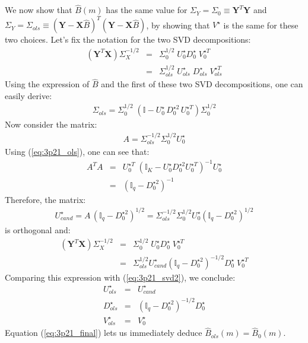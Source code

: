 \begin{itemize}
    We now show that $\hat{B}(m)$ has the same value for $\Sigma_Y = \Sigma_{0} \equiv \mathbf{Y}^T \mathbf{Y}$ and  $\Sigma_Y = \Sigma_{ols} \equiv \left( \mathbf{Y} - \mathbf{X} \hat{B} \right)^T \left( \mathbf{Y} - \mathbf{X} \hat{B} \right)$, by showing that $V ^{\star}$ is the same for these two choices. Let's fix the notation for the two SVD decompositions:
    \begin{eqnarray} \label{eq:3p21_svd1}
    (\mathbf{Y}^T \mathbf{X}) \Sigma_X^{-1/2} & = & \Sigma_{0}^{1/2} \;U_0 ^{\star} D_0 ^{\star}\; V_0 ^{\star T} \\
    \label{eq:3p21_svd2} & = & \Sigma_{ols}^{1/2} \;U_{ols} ^{\star}\; D_{ols} ^{\star}\; V_{ols} ^{\star T}
    \end{eqnarray}
    Using the expression of $\hat{B}$ and the first of these two SVD decompositions, one can easily derive:
    \begin{eqnarray} \label{eq:3p21_ols}
    \Sigma_{ols} = \Sigma_{0}^{1/2} \;\left( \mathbb{I} - U_0 ^{\star}\, D ^{\star 2}_0\, U_0 ^{\star T} \right) \Sigma_{0}^{1/2}
    \end{eqnarray}
    Now consider the matrix:
    \begin{eqnarray*}
        A = \Sigma_{ols}^{-1/2} \Sigma_{0}^{1/2} U ^{\star}_0
    \end{eqnarray*}
    Using (\ref{eq:3p21_ols}), one can see that:
    \begin{eqnarray*}
        A^TA & = & U_0 ^{\star T} \; \left( \mathbb{I}_K - U ^{\star}_0 D ^{\star 2}_0 U_0 ^{\star T} \right)^{-1} U_0 ^{\star} \\
        & = & \left( \mathbb{I}_q - D ^{\star 2}_0 \right)^{-1}
    \end{eqnarray*}
    Therefore, the matrix:
    \begin{eqnarray*}
        U ^{\star}_{cand}  =  A \, \left( \mathbb{I}_q - D ^{\star 2}_0 \right)^{1/2} = \Sigma_{ols}^{-1/2} \Sigma_{0}^{1/2} U ^{\star}_0 \left( \mathbb{I}_q - D ^{\star 2}_0 \right)^{1/2}
    \end{eqnarray*}
    is orthogonal and:
    \begin{eqnarray*}
        (\mathbf{Y}^T \mathbf{X}) \Sigma_X^{-1/2} & = & \Sigma_{0}^{1/2} \;U_0 ^{\star} D_0 ^{\star}\; V_0 ^{\star T}\\
        & = & \Sigma_{ols} ^{1/2} U_{cand} ^{\star} \left( \mathbb{I}_q - D ^{\star 2}_0 \right)^{-1/2} D_0 ^{\star}\; V_0 ^{\star T}
    \end{eqnarray*}
    Comparing this expression with (\ref{eq:3p21_svd2}), we conclude:
    \begin{eqnarray*}
        U ^{\star}_{ols} & = & U ^{\star}_{cand} \\
        D ^{\star}_{ols} & = & \left( \mathbb{I}_q - D ^{\star 2}_0 \right)^{-1/2} D_0 ^{\star} \\
        V ^{\star}_{ols} & = & V ^{\star}_0
    \end{eqnarray*}
    Equation (\ref{eq:3p21_final}) lets us immediately deduce $\hat{B}_{ols}(m) = \hat{B}_0(m)$.
\end{itemize}